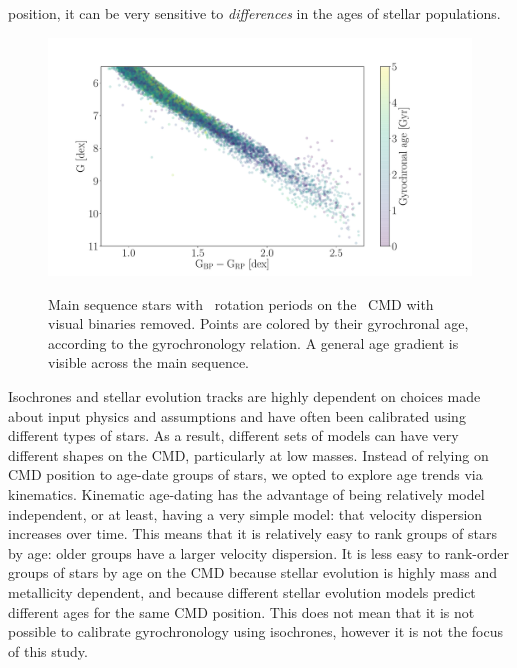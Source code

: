 position, it can be very sensitive to {\it differences} in the ages of stellar
populations.
\begin{figure}
  \caption{
Main sequence stars with \mct\ rotation periods on the \gaia\ CMD with visual
    binaries removed.
    Points are colored by their gyrochronal age, according to the
    \citet{angus2019} gyrochronology relation.
    A general age gradient is visible across the main sequence.
}
  \centering
    \includegraphics[width=1\textwidth]{age_gradient}
\label{fig:age_gradient}
\end{figure}
Isochrones and stellar evolution tracks are highly dependent on choices made
about input physics and assumptions and have often been calibrated using
different types of stars.
As a result, different sets of models can have very different shapes on the
CMD, particularly at low masses.
Instead of relying on CMD position to age-date groups of stars, we opted to
explore age trends via kinematics.
Kinematic age-dating has the advantage of being relatively model independent,
or at least, having a very simple model: that velocity dispersion increases
over time.
This means that it is relatively easy to rank groups of stars by age: older
groups have a larger velocity dispersion.
It is less easy to rank-order groups of stars by age on the CMD because
stellar evolution is highly mass and metallicity dependent, and because
different stellar evolution models predict different ages for the same CMD
position.
This does not mean that it is not possible to calibrate gyrochronology using
isochrones, however it is not the focus of this study.
